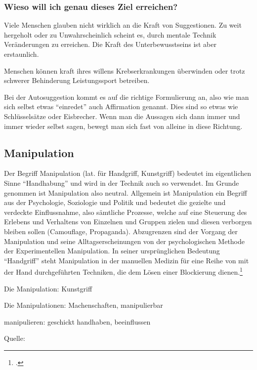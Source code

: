 \subsubsection{Wieso will ich genau dieses Ziel erreichen?}

Viele Menschen glauben nicht wirklich an die Kraft von Suggestionen. Zu weit hergeholt oder zu
Unwahrscheinlich scheint es, durch mentale Technik Veränderungen zu erreichen. Die Kraft des
Unterbewusstseins ist aber erstaunlich.

Menschen können \zB kraft ihres willens Krebserkrankungen überwinden oder trotz schwerer Behinderung
Leistungssport betreiben.

Bei der Autosuggestion kommt es auf die richtige Formulierung an, also wie man sich selbst etwas
\enquote{einredet} auch Affirmation genannt. Dies sind so etwas wie Schlüsselsätze oder Eisbrecher. Wenn man
die Aussagen sich dann immer und immer wieder selbst sagen, bewegt man sich fast von alleine in diese
Richtung.


\subsection{Manipulation}
Der Begriff Manipulation (lat. für Handgriff, Kunstgriff) bedeutet im eigentlichen Sinne \enquote{Handhabung}
und wird in der Technik auch so verwendet. Im Grunde genommen ist Manipulation also neutral.
Allgemein ist Manipulation ein Begriff aus der Psychologie, Soziologie und Politik und bedeutet die
gezielte und verdeckte Einflussnahme, also sämtliche Prozesse, welche auf eine Steuerung des Erlebens
und Verhaltens von Einzelnen und Gruppen zielen und diesen verborgen bleiben sollen (Camouflage,
Propaganda). Abzugrenzen sind der Vorgang der Manipulation und seine Alltagserscheinungen von der
psychologischen Methode der Experimentellen Manipulation. In seiner ursprünglichen Bedeutung
\enquote{Handgriff} steht Manipulation in der manuellen Medizin für eine Reihe von mit der Hand
durchgeführten Techniken, die dem Lösen einer Blockierung dienen.\footcite{Wikipedia:Manipulation}


\begin{eqlist}
	\item[Die Manipulation:] Kunstgriff
	\item[Die Manipulationen:] Machenschaften, manipulierbar
	\item[manipulieren:] geschickt handhaben, beeinflussen
\end{eqlist}
Quelle: \cite{Duden:Fremdwoerterbuch}

